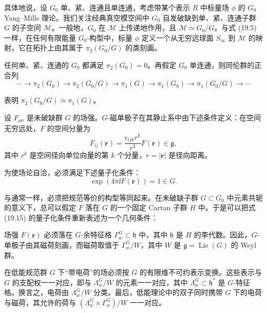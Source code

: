 具体地说，设 $G_0$ 单、紧、连通且单连通，考虑带某个表示 $R$ 中标量场 $\phi$ 的 $G_0$ Yang--Mills 理论。我们关注经典真空模空间中 $G_0$ 自发破缺到单、紧、连通子群 $G$ 的子空间 $\mathcal{M}$。一般地，$G_0$ 在 $\mathcal{M}$ 上传递地作用，且 $\mathcal{M}\simeq G_0/G$。与式 (19.5) 一样，在任何有限能量 $G_0$-构型中，标量 $\phi$ 定义一个从无穷远球面 $S_\infty$ 到 $\mathcal{M}$ 的映射，它在拓扑上由其属于 $\pi_2(G_0/G)$ 的类刻画。

\begin{remark}[19.18]
任何单、紧、连通的 $G_0$ 都满足 $\pi_2(G_0)=0$。再假定 $G_0$ 单连通，则同伦群的正合列
\[
\cdots\to\pi_2(G_0)\to\pi_2(G_0/G)\to\pi_1(G)\to\pi_1(G_0)\to\pi_1(G_0/G)\to\cdots
\]


表明 $\pi_2(G_0/G)\simeq\pi_1(G)$。
\end{remark}

\begin{definition}[19.19]
设 $F_{\mu\nu}$ 是未破缺群 $G$ 的场强。$G$-磁单极子在其静止系中由下述条件定义：在空间无穷远处，$F$ 的空间分量为
\[
F_{ij}(\mathbf{r})=\frac{\epsilon_{ijk}r^k}{r^3}F(\mathbf{r})\in\mathfrak{g},
\]
其中 $r^k$ 是空间径向单位向量的第 $k$ 个分量，$r=|\mathbf{r}|$ 是径向距离。
\end{definition}

\begin{proposition}[19.20]
为使场论自洽，必须满足下述量子化条件：
\begin{equation}
\exp(4\pi\ii F(\mathbf{r}))=1\in G. \tag{19.15}
\end{equation}
\end{proposition}

与通常一样，必须把规范等价的构型等同起来。在未破缺子群 $G\subset G_0$ 中元素共轭的意义下，总可以假定 $F$ 落在 $G$ 的一个固定 Cartan 子群 $H$ 中。于是可以把式 (19.15) 的量子化条件重新表述为一个几何条件：

\begin{proposition}[19.21]
场强 $F(\mathbf{r})$ 必须落在 $G$-余特征格 $\Gamma^G_w\subset\mathfrak{h}$ 中，其中 $\mathfrak{h}$ 是 $H$ 的李代数。因此，$G$-单极子由其磁荷刻画，而磁荷取值于 $\Gamma^G_w/W$，其中 $W$ 是 $\mathfrak{g}=\operatorname{Lie}(G)$ 的 Weyl 群。
\end{proposition}

在低能规范群 $G$ 下“带电荷”的场必须按 $G$ 的有限维不可约表示变换。这些表示与 $G$ 的支配权一一对应，即与 $\Lambda^G_w/W$ 的元素一一对应，其中 $\Lambda^G_w\subset\mathfrak{h}^*$ 是 $G$-特征格。换言之，电荷由 $\Lambda^G_w/W$ 分类。最后，低能理论中的双子同时携带 $G$ 下的电荷与磁荷，其允许的荷与 $(\Lambda^G_w\times\Gamma^G_w)/W$ 一一对应。

